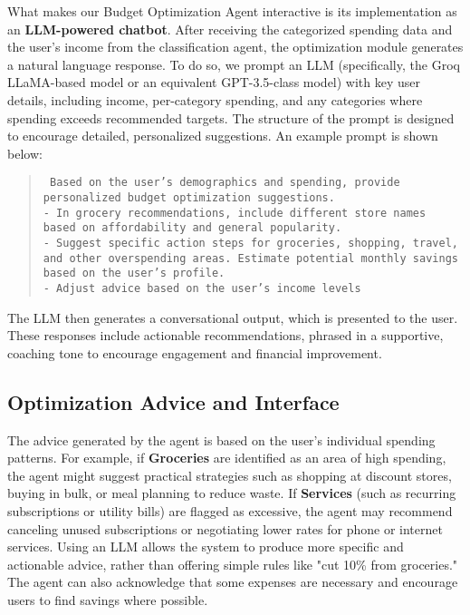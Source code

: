 \documentclass[conference]{IEEEtran}
\begin{document}
What makes our Budget Optimization Agent interactive is its implementation as an \textbf{LLM-powered chatbot}. After receiving the categorized spending data and the user’s income from the classification agent, the optimization module generates a natural language response. To do so, we prompt an LLM (specifically, the Groq LLaMA-based model or an equivalent GPT-3.5-class model) with key user details, including income, per-category spending, and any categories where spending exceeds recommended targets. 
The structure of the prompt is designed to encourage detailed, personalized suggestions. An example prompt is shown below:

\begin{quote}
\small
\texttt{
Based on the user's demographics and spending, provide personalized budget optimization suggestions.\\
- In grocery recommendations, include different store names based on affordability and general popularity.\\
- Suggest specific action steps for groceries, shopping, travel, and other overspending areas. Estimate potential monthly savings based on the user's profile.\\
- Adjust advice based on the user's income levels}
\end{quote}
The LLM then generates a conversational output, which is presented to the user. These responses include actionable recommendations, phrased in a supportive, coaching tone to encourage engagement and financial improvement.



\subsection{Optimization Advice and Interface}
The advice generated by the agent is based on the user's individual spending patterns. For example, if \textbf{Groceries} are identified as an area of high spending, the agent might suggest practical strategies such as shopping at discount stores, buying in bulk, or meal planning to reduce waste. If \textbf{Services} (such as recurring subscriptions or utility bills) are flagged as excessive, the agent may recommend canceling unused subscriptions or negotiating lower rates for phone or internet services. Using an LLM allows the system to produce more specific and actionable advice, rather than offering simple rules like "cut 10\% from groceries." The agent can also acknowledge that some expenses are necessary and encourage users to find savings where possible.
\end{document}
